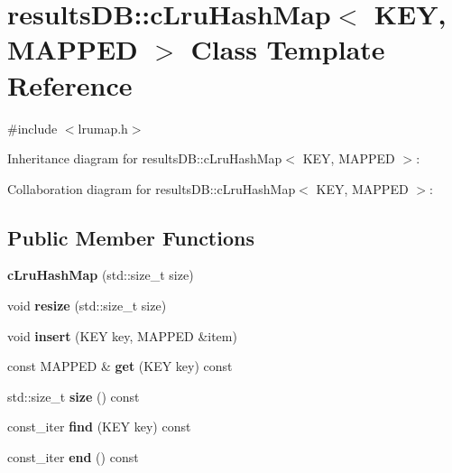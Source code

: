 \hypertarget{classresultsDB_1_1cLruHashMap}{\section{results\-D\-B\-:\-:c\-Lru\-Hash\-Map$<$ K\-E\-Y, M\-A\-P\-P\-E\-D $>$ Class Template Reference}
\label{classresultsDB_1_1cLruHashMap}
}


{\ttfamily \#include $<$lrumap.\-h$>$}



Inheritance diagram for results\-D\-B\-:\-:c\-Lru\-Hash\-Map$<$ K\-E\-Y, M\-A\-P\-P\-E\-D $>$\-:


Collaboration diagram for results\-D\-B\-:\-:c\-Lru\-Hash\-Map$<$ K\-E\-Y, M\-A\-P\-P\-E\-D $>$\-:
\subsection*{Public Member Functions}
\begin{DoxyCompactItemize}
\item 
\hypertarget{classresultsDB_1_1cLruHashMap_a529a79f7a33b289760db7771e368aca3}{{\bfseries c\-Lru\-Hash\-Map} (std\-::size\-\_\-t size)}\label{classresultsDB_1_1cLruHashMap_a529a79f7a33b289760db7771e368aca3}

\item 
\hypertarget{classresultsDB_1_1cLruHashMap_a3936bc57867e3eef937226df4c45752e}{void {\bfseries resize} (std\-::size\-\_\-t size)}\label{classresultsDB_1_1cLruHashMap_a3936bc57867e3eef937226df4c45752e}

\item 
\hypertarget{classresultsDB_1_1cLruHashMap_af251ed1c01101b439f637e1ebd0a9113}{void {\bfseries insert} (K\-E\-Y key, M\-A\-P\-P\-E\-D \&item)}\label{classresultsDB_1_1cLruHashMap_af251ed1c01101b439f637e1ebd0a9113}

\item 
\hypertarget{classresultsDB_1_1cLruHashMap_a2f7d334ea70e8ea5de3ad5aa7416bd4a}{const M\-A\-P\-P\-E\-D \& {\bfseries get} (K\-E\-Y key) const }\label{classresultsDB_1_1cLruHashMap_a2f7d334ea70e8ea5de3ad5aa7416bd4a}

\item 
\hypertarget{classresultsDB_1_1cLruHashMap_acf89071b5fd13acbde66a9644c661c59}{std\-::size\-\_\-t {\bfseries size} () const }\label{classresultsDB_1_1cLruHashMap_acf89071b5fd13acbde66a9644c661c59}

\item 
\hypertarget{classresultsDB_1_1cLruHashMap_a5f1cad81321c5af7ba5fbcebcf40de46}{const\-\_\-iter {\bfseries find} (K\-E\-Y key) const }\label{classresultsDB_1_1cLruHashMap_a5f1cad81321c5af7ba5fbcebcf40de46}

\item 
\hypertarget{classresultsDB_1_1cLruHashMap_ad4f8fb406ed151d4f08960565a025131}{const\-\_\-iter {\bfseries end} () const }\label{classresultsDB_1_1cLruHashMap_ad4f8fb406ed151d4f08960565a025131}

\end{DoxyCompactItemize}
